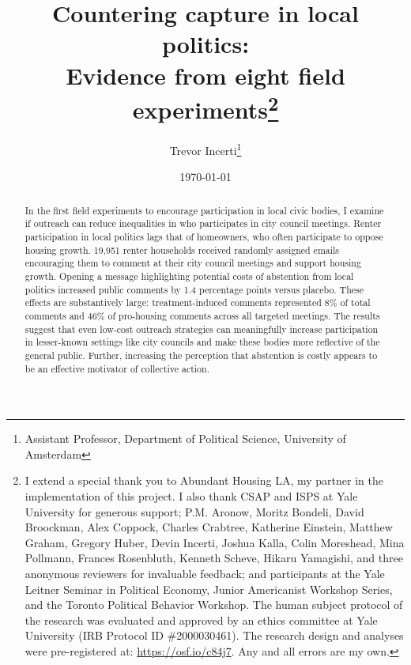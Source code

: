 \documentclass[12pt,final,fleqn]{article}
\theoremstyle{plain}
\begin{document}
\singlespace
\title{\textbf{Countering capture in local politics: \\ Evidence from eight field experiments}\thanks{I extend a special thank you to Abundant Housing LA, my partner in the implementation of this project. I also thank CSAP and ISPS at Yale University for generous support; P.M. Aronow, Moritz Bondeli, David Broockman, Alex Coppock, Charles Crabtree, Katherine Einstein, Matthew Graham, Gregory Huber, Devin Incerti, Joshua Kalla, Colin Moreshead, Mina Pollmann, Frances Rosenbluth, Kenneth Scheve, Hikaru Yamagishi, and three anonymous reviewers for invaluable feedback; and participants at the Yale Leitner Seminar in Political Economy, Junior Americanist Workshop Series, and the Toronto Political Behavior Workshop. The human subject protocol of the research was evaluated and approved by an ethics committee at Yale University (IRB Protocol ID \#2000030461). The research design and analyses were pre-registered at: \url{https://osf.io/c84j7}. Any and all errors are my own.}}

\author{Trevor Incerti\thanks{Assistant Professor, Department of Political Science, University of Amsterdam}}
\date{\today}

\doparttoc %
\faketableofcontents %
 
\part{} %
\parttoc %

\maketitle
\thispagestyle{empty}

\begin{abstract}
\noindent
In the first field experiments to encourage participation in local civic bodies, I examine if outreach can reduce inequalities in who participates in city council meetings. Renter participation in local politics lags that of homeowners, who often participate to oppose housing growth. 19,951 renter households received randomly assigned emails encouraging them to comment at their city council meetings and support housing growth. Opening a message highlighting potential costs of abstention from local politics increased public comments by 1.4 percentage points versus placebo. These effects are substantively large: treatment-induced comments represented 8\% of total comments and 46\% of pro-housing comments across all targeted meetings. The results suggest that even low-cost outreach strategies can meaningfully increase participation in lesser-known settings like city councils and make these bodies more reflective of the general public. Further, increasing the perception that abstention is costly appears to be an effective motivator of collective action.

\end{abstract} 
\end{document}
